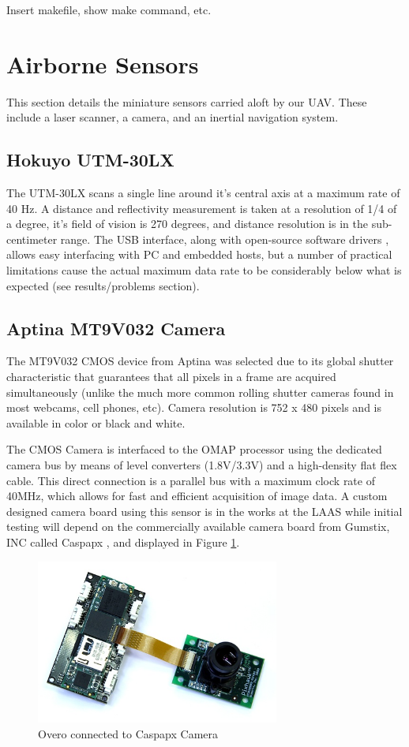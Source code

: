 \documentclass[a4paper,11pt]{report}
\begin{document}
Insert makefile, show make command, etc.

\section{Airborne Sensors}

This section details the miniature sensors carried aloft by our UAV. These include a laser scanner, a camera, and an inertial navigation system.

\subsection{Hokuyo UTM-30LX}
\label{Hokuyo}

The UTM-30LX scans a single line around it's central axis at a maximum rate of 40 Hz. A distance and reflectivity measurement is taken at a resolution of 1/4 of a degree, it's field of vision is 270 degrees, and distance resolution is in the sub-centimeter range. The USB interface, along with open-source software drivers \cite{robotpkg}, allows easy interfacing with PC and embedded hosts, but a number of practical limitations cause the actual maximum data rate to be considerably below what is expected (see results/problems section).

\subsection{Aptina MT9V032 Camera}
\label{caspa}

The MT9V032 CMOS device from Aptina was selected due to its global shutter characteristic that guarantees that all pixels in a frame are acquired simultaneously (unlike the much more common rolling shutter cameras found in most webcams, cell phones, etc). Camera resolution is 752 x 480 pixels and is available in color or black and white. 

The CMOS Camera is interfaced to the OMAP processor using the dedicated camera bus by means of level converters (1.8V/3.3V) and a high-density flat flex cable. This direct connection is a parallel bus with a maximum clock rate of 40MHz, which allows for fast and efficient acquisition of image data. A custom designed camera board using this sensor is in the works at the LAAS while initial testing will depend on the commercially available camera board from Gumstix, INC called Caspapx \cite{caspa}, and displayed in Figure \ref{fig:caspa}.

\begin{figure}[ht]
 \centering
 \includegraphics[width=8cm]{overo_and_caspa.jpeg}
 \caption{Overo connected to Caspapx Camera}
 \label{fig:caspa}
\end{figure}
\end{document}
